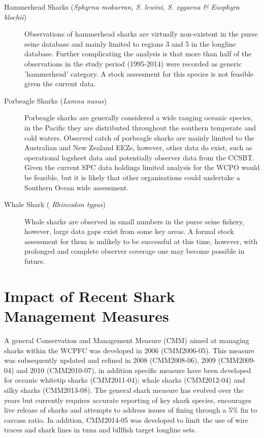 \documentclass[12pt]{SCreport}
\begin{document}
\begin{description}
\item[Hammerhead Sharks (\emph{Sphyrna mokarran, S. lewini, S. zygaena \& Eusphyra blochii})]  Observations of hammerhead sharks are virtually non-existent in the purse seine database and mainly limited to regions 3 and 5 in the longline database. Further complicating the analysis is that more than half of the observations in the study period (1995-2014) were recorded as generic 'hammerhead' category. A stock assessment for this species is not feasible given the current data. 

\item[Porbeagle Sharks (\emph{Lamna nasus})] Porbeagle sharks are generally considered a wide ranging oceanic species, in the Pacific they are distributed throughout the southern temperate and cold waters. Observed catch of porbeagle sharks are mainly limited to the Australian and New Zealand EEZs, however, other data do exist, such as operational logsheet data and potentially observer data from the CCSBT. Given the current SPC data holdings limited analysis for the WCPO would be feasible, but it is likely that other organisations could undertake a Southern Ocean wide assessment.

\item[ Whale Shark (\emph{ Rhincodon typus})] Whale sharks are observed in small numbers in the purse seine fishery, however, large data gaps exist from some key areas. A formal stock assessment for them is unlikely to be successful at this time, however, with prolonged and complete observer coverage one may become possible in future. 


\end{description}

\section{Impact of Recent Shark Management Measures}

A general Conservation and Management Measure (CMM) aimed at managing sharks within the WCPFC was developed in 2006 (CMM2006-05). This measure was subsequently updated and refined in 2008 (CMM2008-06), 2009 (CMM2009-04) and 2010 (CMM2010-07), in addition specific measure have been developed for oceanic whitetip sharks (CMM2011-04); whale sharks (CMM2012-04) and silky sharks (CMM2013-08). The general shark measure has evolved over the years but currently requires accurate reporting of key shark species, encourages live release of sharks and attempts to address issues of fining through a 5\% fin to carcass ratio. In addition, CMM2014-05 was developed to limit the use of wire traces and shark lines in tuna and billfish target longline sets.
\end{document}
